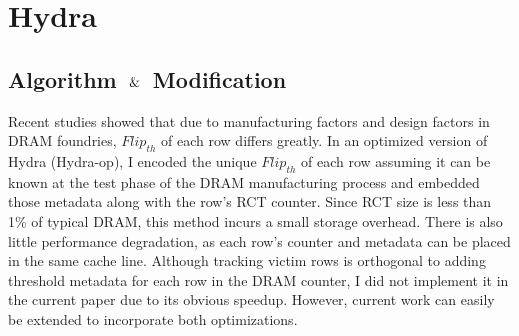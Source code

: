 \section{Hydra}
\subsection{Algorithm $\And$ Modification}
Recent studies \cite{DeeperLook} showed that due to manufacturing factors and design factors in DRAM foundries, 
$Flip_{th}$ of each row differs greatly. In an optimized version of Hydra (Hydra-op), I encoded the unique $Flip_{th}$ of each row 
assuming it can be known at the test phase of the DRAM manufacturing process and embedded those metadata along with the row's RCT counter. 
Since RCT size is less than 1\% of typical DRAM, this method incurs a small storage overhead. 
There is also little performance degradation, as each row's counter and metadata can be placed in the same cache line. 
Although tracking victim rows is orthogonal to adding threshold metadata for each row in the DRAM counter, I did not implement it in the 
current paper due to its obvious speedup. However, current work can easily be extended to incorporate both optimizations. 


